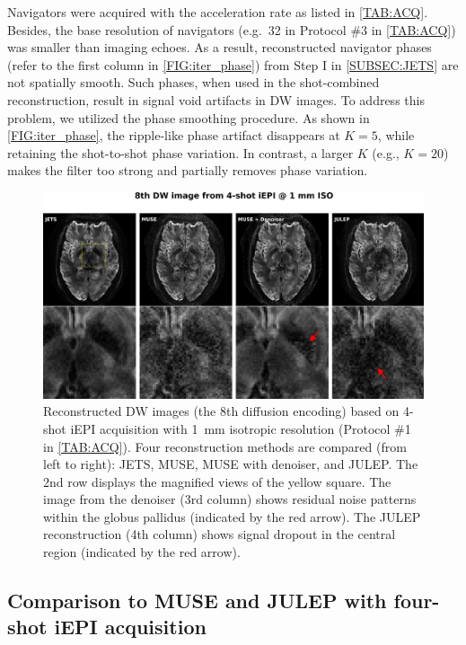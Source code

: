\documentclass[preprint,12pt,authoryear,review]{elsarticle}
\begin{document}
    Navigators were acquired with the acceleration rate
    as listed in \cref{TAB:ACQ}.
    Besides, the base resolution of navigators
    (e.g.~32 in Protocol \#3 in \cref{TAB:ACQ})
    was smaller than imaging echoes.
    As a result, reconstructed navigator phases
    (refer to the first column in \cref{FIG:iter_phase})
    from Step I in \cref{SUBSEC:JETS}
    are not spatially smooth.
    Such phases, when used in the shot-combined reconstruction,
    result in signal void artifacts in DW images.
    To address this problem, we utilized the phase smoothing procedure.
    As shown in \cref{FIG:iter_phase},
    the ripple-like phase artifact disappears at $K = 5$,
    while retaining the shot-to-shot phase variation.
    In contrast, a larger $K$ (e.g., $K = 20$) makes the filter too strong
    and partially removes phase variation.

    \begin{figure}
        \centering
        \includegraphics[width=\textwidth]{../figures/fig4.png}
        \caption{Reconstructed DW images
        (the 8th diffusion encoding)
        based on 4-shot iEPI acquisition with 1~mm isotropic resolution
        (Protocol \#1 in \cref{TAB:ACQ}).
        Four reconstruction methods are compared (from left to right):
        JETS, MUSE, MUSE with denoiser, and JULEP.
        The 2nd row displays the magnified views of the yellow square.
        The image from the denoiser (3rd column)
        shows residual noise patterns
        within the globus pallidus (indicated by the red arrow).
        The JULEP reconstruction (4th column) shows signal dropout
        in the central region (indicated by the red arrow).}
        \label{FIG:4shot_comp}
    \end{figure}

    \subsection{Comparison to MUSE and JULEP with four-shot iEPI acquisition}
\end{document}
